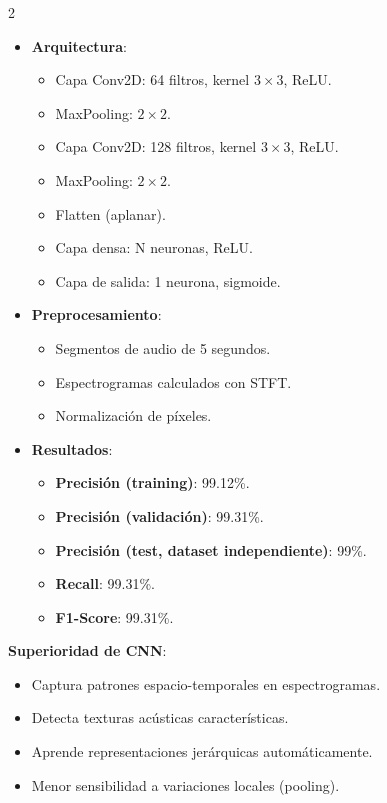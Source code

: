 \documentclass[12pt]{report}
\newenvironment{tightmulticols}{%
  \begin{multicols}{2}
  \setlength{\parskip}{1.2pt}
  \linespread{1}\selectfont
}{%
  \end{multicols}
}
\begin{document}
\begin{tightmulticols}
\begin{itemize}
    \item \textbf{Arquitectura}:
    \begin{itemize}
        \item Capa Conv2D: 64 filtros, kernel $3 \times 3$, ReLU.
        \item MaxPooling: $2 \times 2$.
        \item Capa Conv2D: 128 filtros, kernel $3 \times 3$, ReLU.
        \item MaxPooling: $2 \times 2$.
        \item Flatten (aplanar).
        \item Capa densa: N neuronas, ReLU.
        \item Capa de salida: 1 neurona, sigmoide.
    \end{itemize}
    
    \item \textbf{Preprocesamiento}:
    \begin{itemize}
        \item Segmentos de audio de 5 segundos.
        \item Espectrogramas calculados con STFT.
        \item Normalización de píxeles.
    \end{itemize}
    
    \item \textbf{Resultados}:
    \begin{itemize}
        \item \textbf{Precisión (training)}: 99.12\%.
        \item \textbf{Precisión (validación)}: 99.31\%.
        \item \textbf{Precisión (test, dataset independiente)}: 99\%.
        \item \textbf{Recall}: 99.31\%.
        \item \textbf{F1-Score}: 99.31\%.
    \end{itemize}
\end{itemize}

\noindent\textbf{Superioridad de CNN}:
\begin{itemize}
    \item Captura patrones espacio-temporales en espectrogramas.
    \item Detecta texturas acústicas características.
    \item Aprende representaciones jerárquicas automáticamente.
    \item Menor sensibilidad a variaciones locales (pooling).
\end{itemize}


\end{tightmulticols}
\end{document}
